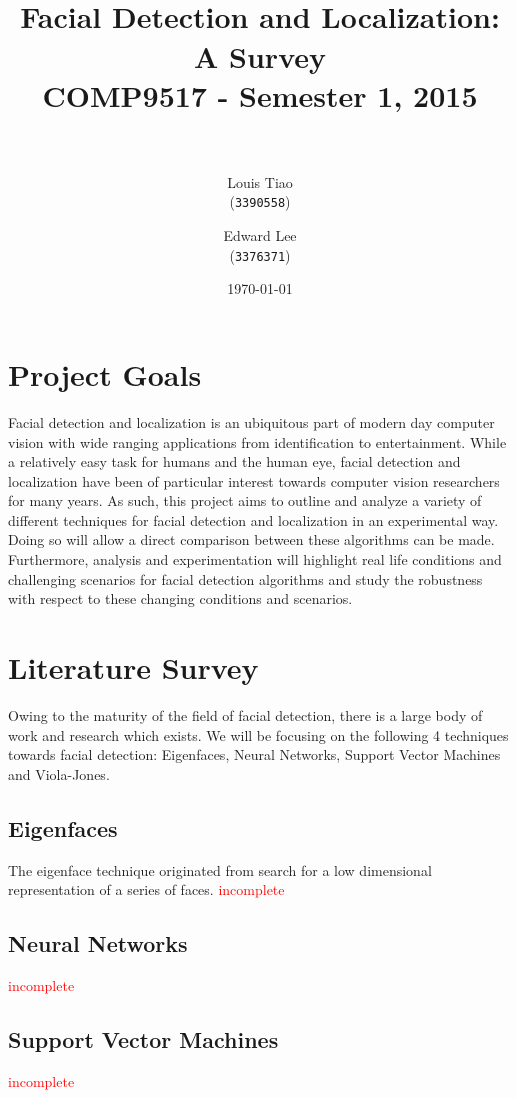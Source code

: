 \documentclass[11pt, twocolumn]{article} %
\title{ 
\normalfont \normalsize 
\horrule{0.5pt} \\[0.4cm] %
\Huge Facial Detection and Localization: A Survey \\[0.5cm]
\large COMP9517 - Semester 1, 2015 \\ [0.5cm]
\horrule{2pt} \\[0.5cm] %
}
\author{
  Louis Tiao \\
  (\texttt{3390558})
  \and
  Edward Lee\\
  (\texttt{3376371})
} %
\date{\normalsize\today} %
\theoremstyle{plain}
\theoremstyle{definition}
\theoremstyle{remark}
\numberwithin{equation}{section} %
\numberwithin{figure}{section} %
\numberwithin{table}{section} %
\begin{document}
\maketitle %


\section{Project Goals}

Facial detection and localization is an ubiquitous part of modern day computer vision with wide ranging applications from identification to entertainment. While a relatively easy task for humans and the human eye, facial detection and localization have been of particular interest towards computer vision researchers for many years.  As such, this project aims to outline and analyze a variety of different techniques for facial detection and localization in an experimental way. Doing so will allow a direct comparison between these algorithms can be made. Furthermore, analysis and experimentation will highlight real life conditions and challenging scenarios for facial detection algorithms and study the robustness with respect to these changing conditions and scenarios.

\section{Literature Survey}
Owing to the maturity of the field of facial detection, there is a large body of work and research which exists. We will be focusing on the following 4 techniques towards facial detection: Eigenfaces, Neural Networks, Support Vector Machines and Viola-Jones.

\subsection{Eigenfaces}
The eigenface technique originated from search for a low dimensional representation of a series of faces.
\textcolor{red}{incomplete}

\subsection{Neural Networks}
\textcolor{red}{incomplete}

\subsection{Support Vector Machines}
\textcolor{red}{incomplete}
\end{document}
